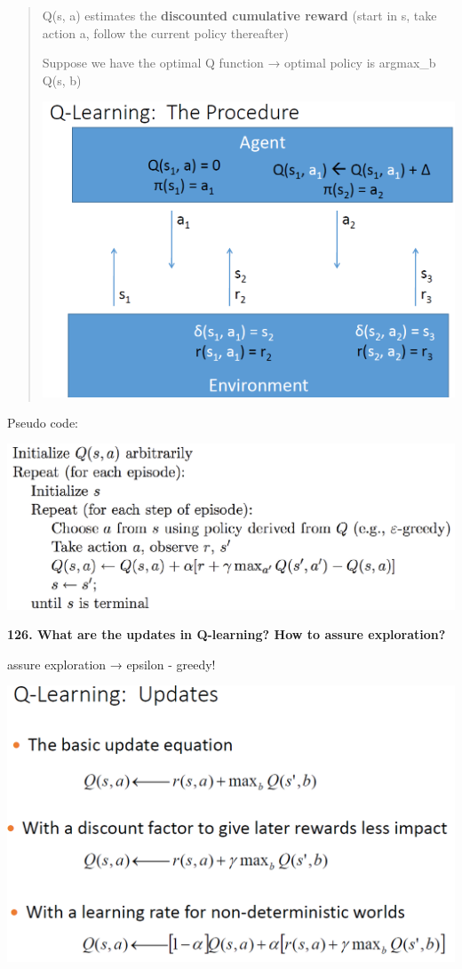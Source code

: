 \begin{quote}
Q(s, a) estimates the \textbf{discounted cumulative reward} (start in s,
take action a, follow the current policy thereafter)

Suppose we have the optimal Q function → optimal policy is argmax\_b
Q(s, b)

\includegraphics[width=\columnwidth]{media/image3.png}
\end{quote}

Pseudo code:

\includegraphics[width=\columnwidth]{media/image14.png}

\textbf{126. What are the updates in Q-learning? How to assure
exploration?}

assure exploration → epsilon - greedy!

\includegraphics[width=\columnwidth]{media/image4.png}


